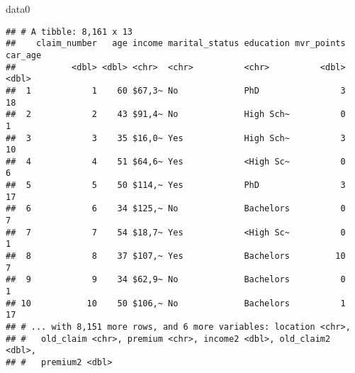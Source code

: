 \documentclass[]{article}
\newenvironment{Shaded}{\begin{snugshade}}{\end{snugshade}}
\newcommand{\KeywordTok}[1]{\textcolor[rgb]{0.13,0.29,0.53}{\textbf{#1}}}
\newcommand{\DecValTok}[1]{\textcolor[rgb]{0.00,0.00,0.81}{#1}}
\newcommand{\StringTok}[1]{\textcolor[rgb]{0.31,0.60,0.02}{#1}}
\newcommand{\OperatorTok}[1]{\textcolor[rgb]{0.81,0.36,0.00}{\textbf{#1}}}
\newcommand{\NormalTok}[1]{#1}
\begin{document}
\begin{Shaded}
\begin{Highlighting}[]
\NormalTok{data0}
\end{Highlighting}
\end{Shaded}

\begin{verbatim}
## # A tibble: 8,161 x 13
##    claim_number   age income marital_status education mvr_points car_age
##           <dbl> <dbl> <chr>  <chr>          <chr>          <dbl>   <dbl>
##  1            1    60 $67,3~ No             PhD                3      18
##  2            2    43 $91,4~ No             High Sch~          0       1
##  3            3    35 $16,0~ Yes            High Sch~          3      10
##  4            4    51 $64,6~ Yes            <High Sc~          0       6
##  5            5    50 $114,~ Yes            PhD                3      17
##  6            6    34 $125,~ No             Bachelors          0       7
##  7            7    54 $18,7~ Yes            <High Sc~          0       1
##  8            8    37 $107,~ Yes            Bachelors         10       7
##  9            9    34 $62,9~ No             Bachelors          0       1
## 10           10    50 $106,~ No             Bachelors          1      17
## # ... with 8,151 more rows, and 6 more variables: location <chr>,
## #   old_claim <chr>, premium <chr>, income2 <dbl>, old_claim2 <dbl>,
## #   premium2 <dbl>
\end{verbatim}

\begin{Shaded}
\end{Shaded}
\end{document}
